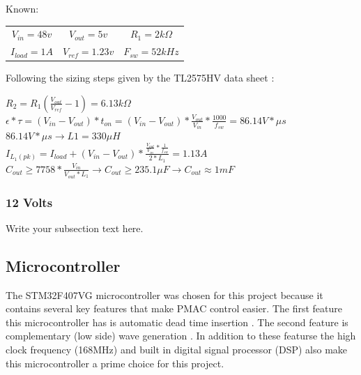 \documentclass{article}
\begin{document}
		\vspace{3mm}
		\noindent Known:
		\begin{center}
			\begin{tabular}{ c c c }
			$V_{in} = 48v$ & $V_{out} = 5v$ & $R_{1} = 2k\Omega$ \\
			$I_{load} = 1A$ & $V_{ref} = 1.23v$ & $F_{sw} = 52kHz$
			\end{tabular}
		\end{center}
	
		\noindent Following the sizing steps given by the TL2575HV data sheet \cite{buck converter}:
		\begin{center}
			$R_{2} = R_{1}(\frac{V_{out}}{V_{ref}} - 1) = 6.13k\Omega$ \\
			\vspace{2mm}
			$\epsilon * \tau = (V_{in} - V_{out})*t_{on} = (V_{in} - V_{out}) * \frac{V_{out}}{V_{in}} * \frac{1000}{f_{sw}} = 86.14 V*\mu s$ \\
			\vspace{4mm}
			$86.14 V*\mu s \rightarrow L1 = 330\mu H$ \\
			\vspace{3mm}
			$I_{L_{1}(pk)} = I_{load} + (V_{in} - V_{out}) * \frac{\frac{V_{out}}{V_{in}} * \frac{1}{f_{sw}}}{2*L_{1}} = 1.13 A$ \\
			\vspace{4mm}
			$C_{out} \ge 7758 * \frac{V_{in}}{V_{out} * L_{1}} \rightarrow C_{out} \ge 235.1\mu F \rightarrow C_{out} \approx 1mF$
		\end{center}
		
		
		\subsubsection{12 Volts}
		Write your subsection text here.
	
		\subsection{Microcontroller}
		The STM32F407VG microcontroller was chosen for this project because it contains several key features that make PMAC control easier.  The first feature this microcontroller has is automatic dead time insertion \cite{stm32f4 ref manual}.  The second feature is  complementary (low side) wave generation \cite{stm32f4 ref manual}.  In addition to these featurse the high clock frequency (168MHz) and built in digital signal processor (DSP) \cite{stm32f4 ref manual} also make this microcontroller a prime choice for this project.
	
\end{document}

